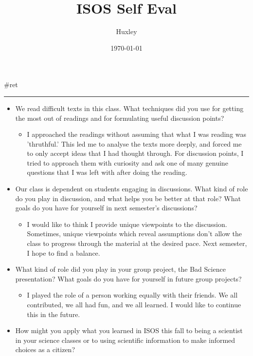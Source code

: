 \documentclass[letterpaper]{article}
\author{Huxley}
\date{\today}
\title{ISOS Self Eval}
\renewcommand{\tableofcontents}{}
\begin{document}
\tableofcontents

\#ret

\noindent\rule{\textwidth}{0.5pt}

\begin{itemize}
\item We read difficult texts in this class. What techniques did you use for
getting the most out of readings and for formulating useful discussion
points?

\begin{itemize}
\item I approached the readings without assuming that what I was reading
was 'thruthful.' This led me to analyse the texts more deeply, and
forced me to only accept ideas that I had thought through. For
discussion points, I tried to approach them with curiosity and ask
one of many genuine questions that I was left with after doing the
reading.
\end{itemize}

\item Our class is dependent on students engaging in discussions. What kind
of role do you play in discussion, and what helps you be better at
that role? What goals do you have for yourself in next semester's
discussions?

\begin{itemize}
\item I would like to think I provide unique viewpoints to the discussion.
Sometimes, unique viewpoints which reveal assumptions don't allow
the class to progress through the material at the desired pace. Next
semester, I hope to find a balance.
\end{itemize}

\item What kind of role did you play in your group project, the Bad Science
presentation? What goals do you have for yourself in future group
projects?

\begin{itemize}
\item I played the role of a person working equally with their friends. We
all contributed, we all had fun, and we all learned. I would like to
continue this in the future.
\end{itemize}

\item How might you apply what you learned in ISOS this fall to being a
scientist in your science classes or to using scientific information
to make informed choices as a citizen?


\end{itemize}
\end{document}
